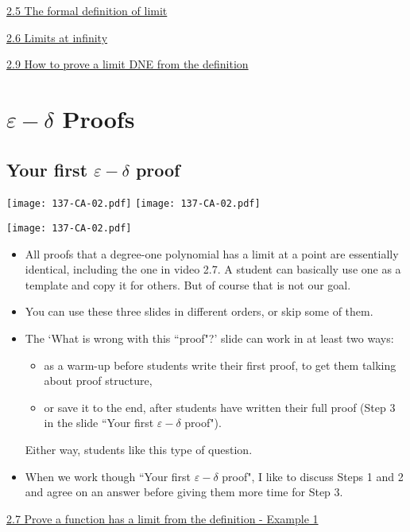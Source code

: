 \documentclass[11pt]{article}
\newcommand{\n}{\newpage}
\newcommand{\e}{\varepsilon}
\newcommand{\nl}{\hfill \vspace{-1.1\baselineskip}} %
\newcommand{\vv}{\hspace{8mm} \href{https://www.youtube.com/watch?v=eCBM1tVHDqo&list=PLlwePzQY_wW8P_I8BFgm0-upywEwTKd8_&index=5}{2.5 The formal definition of limit}}
\newcommand{\vvi}{\hspace{8mm} \href{https://www.youtube.com/watch?v=QNuoKYCO-mM&list=PLlwePzQY_wW8P_I8BFgm0-upywEwTKd8_&index=6}{2.6 Limits at infinity}}
\newcommand{\vvii}{\hspace{8mm} \href{https://www.youtube.com/watch?v=-oq8jPI74tY&list=PLlwePzQY_wW8P_I8BFgm0-upywEwTKd8_&index=7}{2.7 Prove a function has a limit from the definition - Example 1}}
\newcommand{\vix}{\hspace{8mm} \href{https://www.youtube.com/watch?v=VOEzUbNTCSk&list=PLlwePzQY_wW8P_I8BFgm0-upywEwTKd8_&index=9}{2.9 How to prove a limit DNE from the definition}}
\begin{document}
\begin{videos}
\vv 

\vvi

 \vix
\end{videos}

\n
\newpage
\section{$\e-\delta$ Proofs}
\subsection{Your first $\e-\delta$ proof} 

\begin{center}
{ \texttt{[image: 137-CA-02.pdf]}}
\quad
{ \texttt{[image: 137-CA-02.pdf]}}

{ \texttt{[image: 137-CA-02.pdf]}}
\end{center}

\begin{comments}
\nl
	\begin{itemize}
		\item  All proofs that a degree-one polynomial has a limit at a point are essentially identical, including the one in video 2.7.   A student can basically use one as a template and copy it for others.  But of course that is not our goal.
		\item You can use these three slides in different orders, or skip some of them.
		\item The `What is wrong with this ``proof"?' slide  can work in at least two ways:
			\begin{itemize}
				\item as a warm-up before students write their first proof, to get them talking about proof structure,
				\item or save it to the end, after students have written their full proof (Step 3 in the slide ``Your first $\e-\delta$ proof").
			\end{itemize}
				Either way, students like this type of question.
		\item When we work though ``Your first $\e-\delta$ proof", I like to discuss Steps 1 and 2 and agree on an answer before giving them more time for Step 3.
	\end{itemize}
\end{comments}

\begin{videos}
\vvii
\end{videos}
\end{document}
